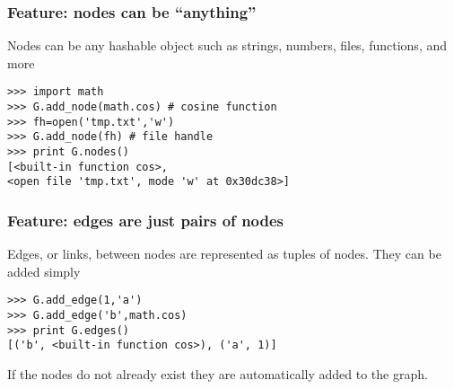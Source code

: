 \begin{frame}[fragile]
\frametitle{Feature: nodes can be ``anything''}

Nodes can be any hashable object such as strings,
numbers, files, functions, and more
\begin{block}{}
\begin{verbatim}
>>> import math
>>> G.add_node(math.cos) # cosine function
>>> fh=open('tmp.txt','w')
>>> G.add_node(fh) # file handle
>>> print G.nodes()
[<built-in function cos>,
<open file 'tmp.txt', mode 'w' at 0x30dc38>]
\end{verbatim}
\end{block}


\end{frame}



\begin{frame}[fragile]
\frametitle{Feature: edges are just pairs of nodes}
Edges, or links, between nodes are represented as tuples of nodes.
They can be added simply
\begin{block}{}
\begin{verbatim}
>>> G.add_edge(1,'a')
>>> G.add_edge('b',math.cos)
>>> print G.edges()
[('b', <built-in function cos>), ('a', 1)]
\end{verbatim}
\end{block}

If the nodes do not already exist they are automatically added to the graph.



\end{frame}



